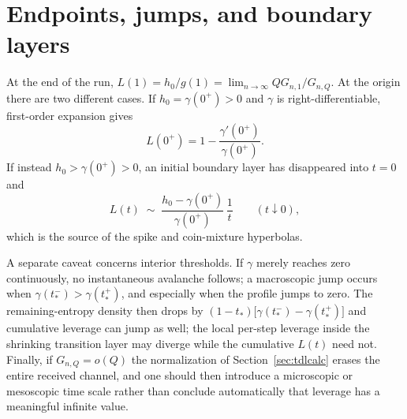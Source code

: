 \section{Endpoints, jumps, and boundary
layers}\label{app:endpoints}

At the end of the run,
$L(1) = h_0/g(1) = \lim_{n\to\infty} Q G_{n,1}/G_{n,Q}$. At the
origin there are two different cases. If $h_0 = \gamma(0^+)>0$ and
$\gamma$ is right-differentiable, first-order expansion gives
%
\begin{equation}
  L(0^+) = 1-\frac{\gamma'(0^+)}{\gamma(0^+)} .
  \label{eq:appLzero}
\end{equation}
%
If instead $h_0>\gamma(0^+)>0$, an initial boundary layer has
disappeared into $t = 0$ and
%
\begin{equation}
  L(t)\;\sim\;\frac{h_0-\gamma(0^+)}{\gamma(0^+)}\,\frac1t
  \qquad (t\downarrow0), 
  \label{eq:boundarylayer}
\end{equation}
%
which is the source of the spike and coin-mixture hyperbolas.

A separate caveat concerns interior thresholds. If $\gamma$ merely
reaches zero continuously, no instantaneous avalanche follows; a
macroscopic jump occurs when $\gamma(t_*^-)>\gamma(t_*^+)$, and
especially when the profile jumps to zero. The remaining-entropy
density then drops by
$(1-t_*)\big[\gamma(t_*^-)-\gamma(t_*^+)\big]$ and cumulative
leverage can jump as well; the local per-step leverage inside the
shrinking transition layer may diverge while the cumulative $L(t)$
need not. Finally, if $G_{n,Q} = o(Q)$ the normalization of
Section~\ref{sec:tdlcalc} erases the entire received channel, and one
should then introduce a microscopic or mesoscopic time scale rather
than conclude automatically that leverage has a meaningful infinite
value.
